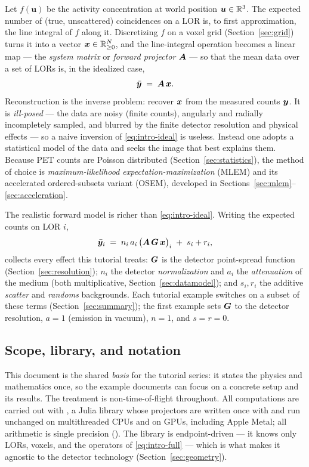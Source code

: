 Let $f(\bm{u})$ be the activity concentration at world position
$\bm{u}\in\mathbb{R}^3$. The expected number of (true, unscattered) coincidences on a
LOR is, to first approximation, the line integral of $f$ along it. Discretizing
$f$ on a voxel grid (Section~\ref{sec:grid}) turns it into a vector
$\bm{x}\in\mathbb{R}^{N}_{\ge 0}$, and the line-integral operation becomes a linear map
--- the \emph{system matrix} or \emph{forward projector} $\bm{A}$ --- so that the
mean data over a set of LORs is, in the idealized case,
\begin{equation}
  \bar{\bm{y}} \;=\; \bm{A}\,\bm{x} .
  \label{eq:intro-ideal}
\end{equation}
Reconstruction is the inverse problem: recover $\bm{x}$ from the measured counts
$\bm{y}$. It is \emph{ill-posed} --- the data are noisy (finite counts), angularly
and radially incompletely sampled, and blurred by the finite detector
resolution and physical effects --- so a naive inversion of \eqref{eq:intro-ideal}
is useless. Instead one adopts a statistical model of the data and seeks the
image that best explains them. Because PET counts are Poisson distributed
(Section~\ref{sec:statistics}), the method of choice is
\emph{maximum-likelihood expectation-maximization} (MLEM) and its accelerated
ordered-subsets variant (OSEM), developed in
Sections~\ref{sec:mlem}--\ref{sec:acceleration}.

The realistic forward model is richer than \eqref{eq:intro-ideal}. Writing the
expected counts on LOR $i$,
\begin{equation}
  \bar{\bm{y}}_i \;=\; n_i\, a_i \,\bigl(\bm{A}\,\bm{G}\,\bm{x}\bigr)_i \;+\; s_i + r_i ,
  \label{eq:intro-full}
\end{equation}
collects every effect this tutorial treats: $\bm{G}$ is the detector
point-spread function (Section~\ref{sec:resolution}); $n_i$ the detector
\emph{normalization} and $a_i$ the \emph{attenuation} of the medium (both
multiplicative, Section~\ref{sec:datamodel}); and $s_i,r_i$ the additive
\emph{scatter} and \emph{randoms} backgrounds. Each tutorial example switches
on a subset of these terms (Section~\ref{sec:summary}); the first example sets
$\bm{G}$ to the detector resolution, $a=1$ (emission in vacuum), $n=1$, and
$s=r=0$.

\subsection{Scope, library, and notation}
\label{sec:intro:scope}

This document is the shared \emph{basis} for the tutorial series: it states the
physics and mathematics once, so the example documents can focus on a concrete
setup and its results. The treatment is non-time-of-flight throughout. All
computations are carried out with , a Julia library whose
projectors are written once with  and run
unchanged on multithreaded CPUs and on GPUs, including Apple Metal; all
arithmetic is single precision (). The library is endpoint-driven
--- it knows only LORs, voxels, and the operators of
\eqref{eq:intro-full} --- which is what makes it agnostic to the detector
technology (Section~\ref{sec:geometry}).

